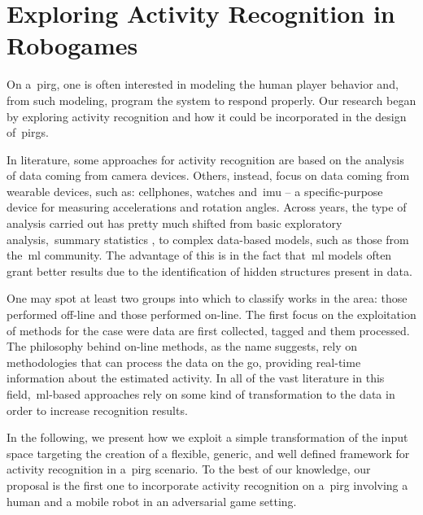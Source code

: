 \chapter{Exploring Activity Recognition in Robogames}\label{ch:activity}

On a~\gls{pirg}, one is often interested in modeling the human player behavior and, from such modeling, program the system to respond properly. Our research began by exploring activity recognition and how it could be incorporated in the design of~\gls{pirg}s. 

In literature, some approaches for activity recognition are based on the analysis of data coming from camera devices. Others, instead, focus on data coming from wearable devices, such as: cellphones, watches and~\gls{imu} -- a specific-purpose device for measuring accelerations and rotation angles. Across years, the type of analysis carried out has pretty much shifted from basic exploratory analysis,~\eg summary statistics %
, to complex data-based models, such as those from the~\gls{ml} community. The advantage of this is in the fact that~\gls{ml} models often grant better results due to the identification of hidden structures present in data.

One may spot at least two groups into which to classify works in the area: those performed off-line and those performed on-line. The first focus on the exploitation of methods for the case were data are first collected, tagged and them processed. The philosophy behind on-line methods, as the name suggests, rely on methodologies that can process the data on the go, providing real-time information about the estimated activity. In all of the vast literature in this field,~\gls{ml}-based approaches rely on some kind of transformation to the data in order to increase recognition results. %

In the following, we present how we exploit a simple transformation of the input space targeting the creation of a flexible, generic, and well defined framework for activity recognition in a~\gls{pirg} scenario. To the best of our knowledge, our proposal is the first one to incorporate activity recognition on a~\glsdesc{pirg} involving a human and a mobile robot in an adversarial game setting.

